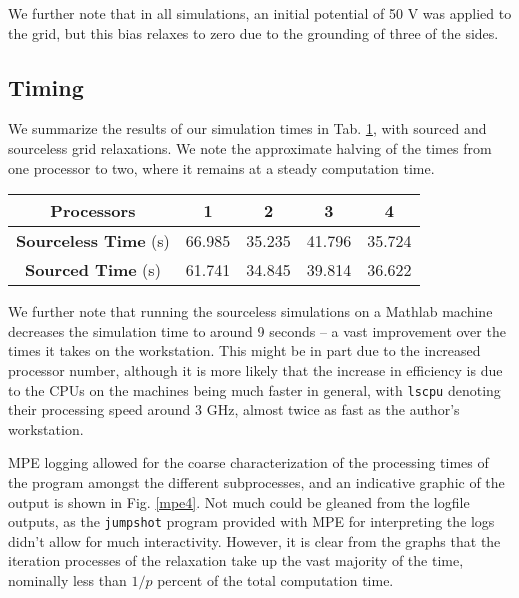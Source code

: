\documentclass[reprint, amsmath, amssymb, aps, floatfix]{revtex4-1}
\def\inline{\lstinline[basicstyle=\ttfamily,keywordstyle={}]}
\begin{document}
We further note that in all simulations, an initial potential of 50 V was applied to the grid, but this bias relaxes to zero due to the grounding of three of the sides.



\subsection{Timing}

We summarize the results of our simulation times in Tab. \ref{tab:times}, with sourced and sourceless grid relaxations. We note the approximate halving of the times from one processor to two, where it remains at a steady computation time.

\begin{table}
	\vspace{2ex}
	\begin{tabular}{|c|c|c|c|c|}
		\hline
		\textbf{Processors} & \textbf{1} & \textbf{2} & \textbf{3} & \textbf{4}\\ \hline
		\textbf{Sourceless Time} (s) & 66.985 & 35.235 & 41.796 & 35.724\\ \hline
		\textbf{Sourced Time} (s) & 61.741 & 34.845 & 39.814 & 36.622\\ \hline
	\end{tabular}
	\vspace{1ex}
	\label{tab:times}
\end{table}

We further note that running the sourceless simulations on a Mathlab machine decreases the simulation time to around 9 seconds -- a vast improvement over the times it takes on the workstation. This might be in part due to the increased processor number, although it is more likely that the increase in efficiency is due to the CPUs on the machines being much faster in general, with \inline{lscpu} denoting their processing speed around 3 GHz, almost twice as fast as the author's workstation.

MPE logging allowed for the coarse characterization of the processing times of the program amongst the different subprocesses, and an indicative graphic of the output is shown in Fig. \ref{mpe4}. Not much could be gleaned from the logfile outputs, as the \inline{jumpshot} program provided with MPE for interpreting the logs didn't allow for much interactivity. However, it is clear from the graphs that the iteration processes of the relaxation take up the vast majority of the time, nominally less than $1/p$ percent of the total computation time.
\end{document}
